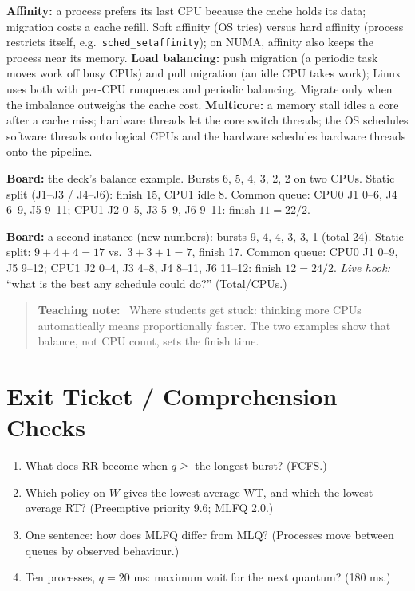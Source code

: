 \documentclass[11pt]{article}
\newenvironment{teachingaside}{\begin{quote}\small\color{primary-gold}\textbf{Teaching note:}\ }{\end{quote}}
\begin{document}
\textbf{Affinity:} a process prefers its last CPU because the cache holds its data; migration costs a cache refill. Soft affinity (OS tries) versus hard affinity (process restricts itself, e.g.\ \texttt{sched\_setaffinity}); on NUMA, affinity also keeps the process near its memory. \textbf{Load balancing:} push migration (a periodic task moves work off busy CPUs) and pull migration (an idle CPU takes work); Linux uses both with per-CPU runqueues and periodic balancing. Migrate only when the imbalance outweighs the cache cost. \textbf{Multicore:} a memory stall idles a core after a cache miss; hardware threads let the core switch threads; the OS schedules software threads onto logical CPUs and the hardware schedules hardware threads onto the pipeline.

\textbf{Board:} the deck's balance example. Bursts 6, 5, 4, 3, 2, 2 on two CPUs. Static split (J1--J3 / J4--J6): finish 15, CPU1 idle 8. Common queue: CPU0 J1 0--6, J4 6--9, J5 9--11; CPU1 J2 0--5, J3 5--9, J6 9--11: finish $11 = 22/2$.

\textbf{Board:} a second instance (new numbers): bursts 9, 4, 4, 3, 3, 1 (total 24). Static split: $9+4+4 = 17$ vs.\ $3+3+1 = 7$, finish 17. Common queue: CPU0 J1 0--9, J5 9--12; CPU1 J2 0--4, J3 4--8, J4 8--11, J6 11--12: finish $12 = 24/2$. \emph{Live hook:} ``what is the best any schedule could do?'' (Total/CPUs.)

\begin{teachingaside}
Where students get stuck: thinking more CPUs automatically means proportionally faster. The two examples show that balance, not CPU count, sets the finish time.
\end{teachingaside}

\section{Exit Ticket / Comprehension Checks}

\begin{enumerate}
  \item What does RR become when $q \ge$ the longest burst? (FCFS.)
  \item Which policy on $W$ gives the lowest average WT, and which the lowest average RT? (Preemptive priority 9.6; MLFQ 2.0.)
  \item One sentence: how does MLFQ differ from MLQ? (Processes move between queues by observed behaviour.)
  \item Ten processes, $q=20$ ms: maximum wait for the next quantum? (180 ms.)
\end{enumerate}
\end{document}
